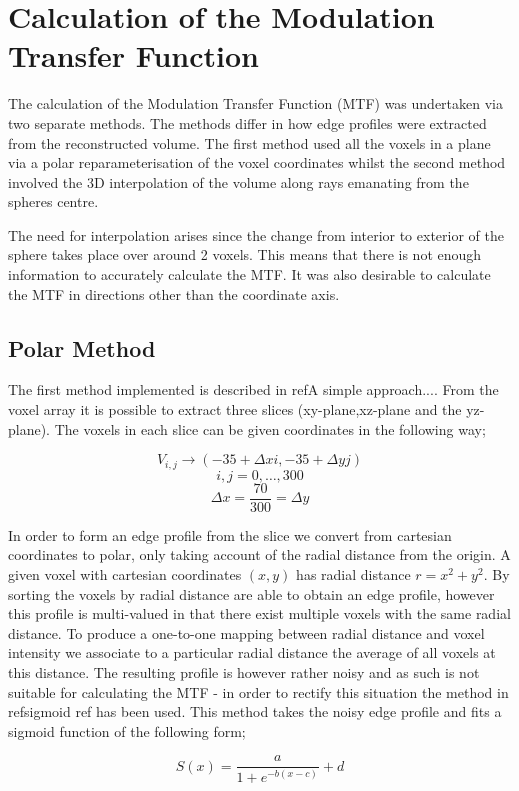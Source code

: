 \documentclass[
  twoside,
  11pt, a4paper,
  footinclude=true,
  headinclude=true,
  cleardoublepage=empty
]{scrbook}
\begin{document}
\section{Calculation of the Modulation Transfer Function}

The calculation of the Modulation Transfer Function (MTF) was undertaken via two separate methods. The methods differ in how edge profiles were extracted from the reconstructed volume. The first method used all the voxels in a plane via a polar reparameterisation of the voxel coordinates whilst the second method involved the 3D interpolation of the volume along rays emanating from the spheres centre.

The need for interpolation arises since the change from interior to exterior of the sphere takes place over around 2 voxels. This means that there is not enough information to accurately calculate the MTF. It was also desirable to calculate the MTF in directions other than the coordinate axis.

\subsection{Polar Method}
The first method implemented is described in ref{A simple approach...}. From the voxel array it is possible to extract three slices (xy-plane,xz-plane and the yz-plane). The voxels in each slice can be given coordinates in the following way;

\[
V_{i,j} \rightarrow (-35+\Delta x i,-35+\Delta y j)
\]
\[
i,j = 0,\dots,300
\]
\[
\Delta x = \frac{70}{300} = \Delta y
\]

In order to form an edge profile from the slice we convert from cartesian coordinates to polar, only taking account of the radial distance from the origin. A given voxel with cartesian coordinates $(x,y)$ has radial distance $r = x^2 + y^2$. By sorting the voxels by radial distance are able to obtain an edge profile, however this profile is multi-valued in that there exist multiple voxels with the same radial distance. To produce a one-to-one mapping between radial distance and voxel intensity we associate to a particular radial distance the average of all voxels at this distance. The resulting profile is however rather noisy and as such is not suitable for calculating the MTF - in order to rectify this situation the method in ref{sigmoid ref} has been used. This method takes the noisy edge profile and fits a sigmoid function of the following form;

\[
S(x) = \frac{a}{1+e^{-b(x-c)}} + d
\]
\end{document}
